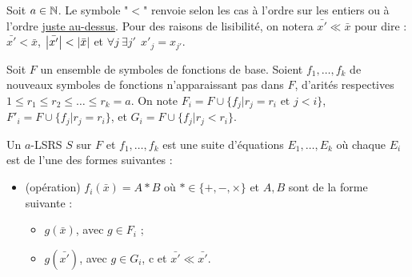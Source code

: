 		Soit $a \in \mathbb{N}$. Le symbole "$<$" renvoie selon les cas à l'ordre sur les entiers ou à l'ordre \hyperref[def:bon_ordre_sur_uplets]{juste au-dessus}. Pour des raisons de lisibilité, on notera $\bar{x'} \ll \bar{x}$ pour dire :  $\bar{x'} < \bar{x}$, $\left|\bar{x'}\right| < \left|\bar{x}\right|$ et $\forall j \: \exists j' \:\: x'_j = x_{j'}$\footnotemark.
		
		
		\begin{definition}[$a$-LSRS]
			\label{def:aLSRS}
			Soit $F$ un ensemble de symboles de fonctions de base. Soient $f_1, \dots, f_k$ de nouveaux symboles de fonctions n'apparaissant pas dans $F$, d'arités respectives $1 \leqslant r_1 \leqslant r_2 \leqslant \dots \leqslant r_k = a$\footnotemark. 			
			On note $F_i = F \cup \{f_j | r_j = r_i \text{ et } j < i\}$, $F'_i = F \cup \{f_j | r_j = r_i\}$, et $G_i = F \cup \{ f_j | r_j < r_i\}$\footnotemark.
			
				
			Un $a$-LSRS $S$ sur $F$ et $f_1, \dots, f_k$ est une suite d'équations $E_1, \dots, E_k$ où chaque $E_i$ est de l'une des formes suivantes :
			
			\begin{itemize}[itemsep=-1mm]
				\item	(opération) 	$f_i\left(\bar{x}\right) = A * B$ où $* \in \{+,-,\times\}$ et $A, B$ sont de la forme suivante : 
						\begin{itemize}[itemsep=-1mm]
							\item 	$g\left(\bar{x}\right)$, avec $g \in F_i$ ;
							\item 	$g\left(\bar{x'}\right)$, avec $g \in G_i$, c et $\bar{x'} \ll \bar{x'}$.
						\end{itemize}
									

\end{itemize}
\end{definition}
